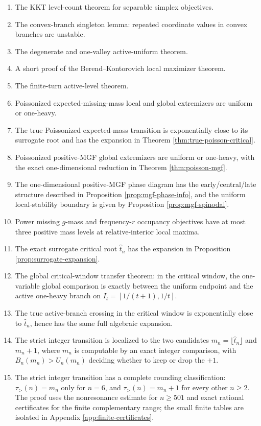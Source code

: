 \documentclass[11pt]{article}
\theoremstyle{definition}
\begin{document}
\begin{enumerate}[label=\textbf{P\arabic*.}]
\item The KKT level-count theorem for separable simplex objectives.
\item The convex-branch singleton lemma: repeated coordinate values in convex branches are unstable.
\item The degenerate and one-valley active-uniform theorem.
\item A short proof of the Berend--Kontorovich local maximizer theorem.
\item The finite-turn active-level theorem.
\item Poissonized expected-missing-mass local and global extremizers are uniform or one-heavy.
\item The true Poissonized expected-mass transition is exponentially close to its surrogate root and has the expansion in Theorem \ref{thm:true-poisson-critical}.
\item Poissonized positive-MGF global extremizers are uniform or one-heavy, with the exact one-dimensional reduction in Theorem \ref{thm:poisson-mgf}.
\item The one-dimensional positive-MGF phase diagram has the early/central/late structure described in Proposition \ref{prop:mgf-phase-info}, and the uniform local-stability boundary is given by Proposition \ref{prop:mgf-spinodal}.
\item Power missing $g$-mass and frequency-$r$ occupancy objectives have at most three positive mass levels at relative-interior local maxima.
\item The exact surrogate critical root $\widehat t_n$ has the expansion in Proposition \ref{prop:surrogate-expansion}.
\item The global critical-window transfer theorem: in the critical window, the one-variable global comparison is exactly between the uniform endpoint and the active one-heavy branch on $I_t=[1/(t+1),1/t]$.
\item The true active-branch crossing in the critical window is exponentially close to $\widehat t_n$, hence has the same full algebraic expansion.
\item The strict integer transition is localized to the two candidates $m_n=\lfloor\widehat t_n\rfloor$ and $m_n+1$, where $m_n$ is computable by an exact integer comparison, with $B_n(m_n)>U_n(m_n)$ deciding whether to keep or drop the $+1$.
\item The strict integer transition has a complete rounding classification: $\tau_>(n)=m_n$ only for $n=6$, and $\tau_>(n)=m_n+1$ for every other $n\ge2$. The proof uses the nonresonance estimate for $n\ge501$ and exact rational certificates for the finite complementary range; the small finite tables are isolated in Appendix \ref{app:finite-certificates}.

\end{enumerate}
\end{document}
